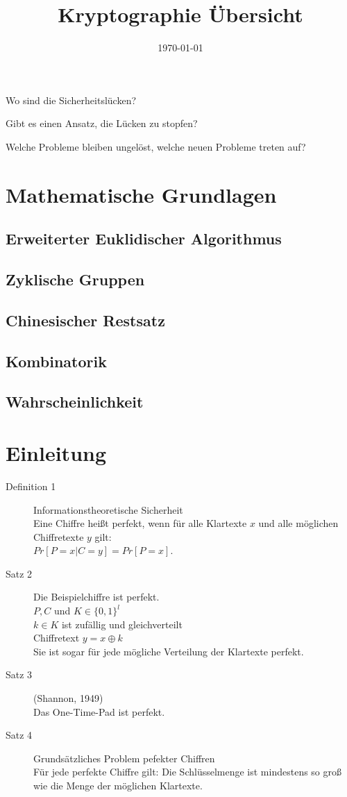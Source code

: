 \documentclass[10pt,a4paper]{article}
\title{Kryptographie Übersicht}
\author{}
\date{\today}
\begin{document}
Wo sind die Sicherheitslücken?

Gibt es einen Ansatz, die Lücken zu stopfen?

Welche Probleme bleiben ungelöst, welche neuen Probleme treten auf?
\setcounter{section}{-1}
\tableofcontents

\pagebreak
\section{Mathematische Grundlagen}
\subsection{Erweiterter Euklidischer Algorithmus}
\subsection{Zyklische Gruppen}
\subsection{Chinesischer Restsatz}
\subsection{Kombinatorik}
\subsection{Wahrscheinlichkeit}
\section{Einleitung}
\begin{description}
	\item[Definition 1] Informationstheoretische Sicherheit\\ Eine Chiffre heißt perfekt, wenn für alle Klartexte $x$ und alle möglichen Chiffretexte $y$ gilt:\\
$Pr[P = x | C = y ] = Pr[P = x]$.
	\item[Satz 2] Die Beispielchiffre ist perfekt.\\
$P, C$ und $K \in \{0, 1\}^l$\\
$k \in K$ ist zufällig und gleichverteilt\\
Chiffretext $y = x \oplus k$\\
Sie ist sogar für jede mögliche Verteilung der Klartexte perfekt.
	\item[Satz 3] (Shannon, 1949)\\
Das One-Time-Pad ist perfekt.
	\item[Satz 4] Grundsätzliches Problem pefekter
Chiffren\\
Für jede perfekte Chiffre gilt: Die Schlüsselmenge ist
mindestens so groß wie die Menge der möglichen Klartexte.
\end{description}
\end{document}
